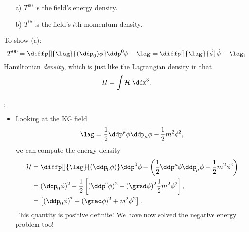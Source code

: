 \begin{itemize}
\begin{enumerate}
            \item[a)] $T^{00}$ is the field's energy density.
            \item[b)] $T^{0i}$ is the field's $i$th momentum density.
        \end{enumerate}
        To show (a):
        \begin{equation*}
            T^{00} = \diffp[]{\lag}{(\ddp_0)\phi} \ddp^0\phi - \lag = \diffp[]{\lag}{\dot\phi} \dot\phi - \lag,
        \end{equation*}
        Hamiltonian \textit{density}, which is just like the Lagrangian density in that
        \begin{equation}
            H = \int \mathcal{H} \;\ddx^3.\label{HamiltonianDensity}
        \end{equation}
\end{itemize}


\sep


\begin{itemize}
    \item Looking at the KG field
        \begin{equation*}
            \lag = \frac{1}{2}\ddp^{\mu}\phi\ddp_{\mu}\phi - \frac{1}{2}m^2\phi^2,
        \end{equation*}
        we can compute the energy density
        \begin{align*}
            \mathcal{H} &= \diffp[]{\lag}{(\ddp_0\phi)}\ddp^0\phi - \left(\frac{1}{2}\ddp^{\mu}\phi\ddp_{\mu}\phi - \frac{1}{2}m^2\phi^2\right) \\
            &= (\ddp_0\phi)^2 - \frac{1}{2}\left[(\ddp^{0}\phi)^2 - (\grad\phi)^2 \frac{1}{2}m^2\phi^2\right], \\
            &= \left[(\ddp_0\phi)^2 + (\grad\phi)^2 + m^2\phi^2\right].
        \end{align*}
        This quantity is positive definite! We have now solved the negative energy problem too!
\end{itemize}